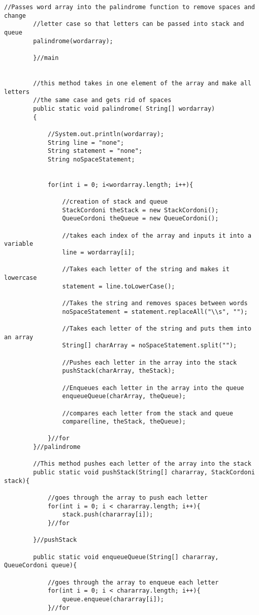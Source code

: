 \documentclass[letterpaper, 10pt,DIV=13]{scrartcl}
\numberwithin{equation}{section} %
\numberwithin{figure}{section} %
\numberwithin{table}{section} %
\begin{document}
\begin{lstlisting}[frame=single, ]
		//Passes word array into the palindrome function to remove spaces and change
		//letter case so that letters can be passed into stack and queue
		palindrome(wordarray);
		
		}//main
	

		//this method takes in one element of the array and make all letters
		//the same case and gets rid of spaces
		public static void palindrome( String[] wordarray)
		{
		
			//System.out.println(wordarray);
			String line = "none";
			String statement = "none";
			String noSpaceStatement;

			
			for(int i = 0; i<wordarray.length; i++){

				//creation of stack and queue
				StackCordoni theStack = new StackCordoni();
				QueueCordoni theQueue = new QueueCordoni();

				//takes each index of the array and inputs it into a variable
				line = wordarray[i];

				//Takes each letter of the string and makes it lowercase
				statement = line.toLowerCase();

				//Takes the string and removes spaces between words
				noSpaceStatement = statement.replaceAll("\\s", "");
				
				//Takes each letter of the string and puts them into an array
				String[] charArray = noSpaceStatement.split("");
				
				//Pushes each letter in the array into the stack
				pushStack(charArray, theStack);

				//Enqueues each letter in the array into the queue
				enqueueQueue(charArray, theQueue);

				//compares each letter from the stack and queue
				compare(line, theStack, theQueue);
				
			}//for
		}//palindrome

		//This method pushes each letter of the array into the stack
		public static void pushStack(String[] chararray, StackCordoni stack){

			//goes through the array to push each letter
			for(int i = 0; i < chararray.length; i++){
				stack.push(chararray[i]);
			}//for
			
		}//pushStack

		public static void enqueueQueue(String[] chararray, QueueCordoni queue){

			//goes through the array to enqueue each letter
			for(int i = 0; i < chararray.length; i++){
				queue.enqueue(chararray[i]);
			}//for
			

\end{lstlisting}
\end{document}
